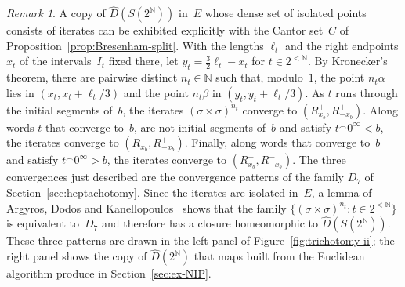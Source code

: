 \documentclass[psamsfonts]{amsart}
\theoremstyle{definition}
\theoremstyle{remark}
\newtheorem{rem}[thm]{Remark}
\numberwithin{equation}{section}
\begin{document}
\begin{rem}\label{rem:Bresenham3-explicit}
A copy of $\hat D(S(2^{\mathbb{N}}))$ in~$E$ whose dense set of isolated points consists of iterates can be exhibited explicitly with the Cantor set~$C$ of Proposition~\ref{prop:Bresenham-split}.
With the lengths $\ell_t$ and the right endpoints $x_t$ of the intervals~$I_t$ fixed there, let $y_t=\frac32\ell_t-x_t$ for $t\in2^{<\mathbb{N}}$.
By Kronecker's theorem, there are pairwise distinct $n_t\in\mathbb{N}$ such that, modulo~$1$, the point $n_t\alpha$ lies in $(x_t,x_t+\ell_t/3)$ and the point $n_t\beta$ in $(y_t,y_t+\ell_t/3)$.
As $t$ runs through the initial segments of~$b$, the iterates $(\sigma\times\sigma)^{n_t}$ converge to $(R_{x_b}^+,R_{-x_b}^+)$.
Along words $t$ that converge to~$b$, are not initial segments of~$b$ and satisfy $t^\frown0^\infty<b$, the iterates converge to $(R_{x_b}^-,R_{-x_b}^+)$.
Finally, along words that converge to~$b$ and satisfy $t^\frown0^\infty>b$, the iterates converge to $(R_{x_b}^+,R_{-x_b}^-)$.
The three convergences just described are the convergence patterns of the family $D_7$ of Section~\ref{sec:heptachotomy}.
Since the iterates are isolated in~$E$, a lemma of Argyros, Dodos and Kanellopoulos~\cite[Lemma~19]{argyros2008rosenthal} shows that the family $\{(\sigma\times\sigma)^{n_t}:t\in2^{<\mathbb{N}}\}$ is equivalent to~$D_7$ and therefore has a closure homeomorphic to $\hat D(S(2^{\mathbb{N}}))$.
These three patterns are drawn in the left panel of Figure~\ref{fig:trichotomy-ii};
the right panel shows the copy of $\hat D(2^{\mathbb{N}})$ that maps built from the Euclidean algorithm produce in Section~\ref{sec:ex-NIP}.
\end{rem}
\end{document}
